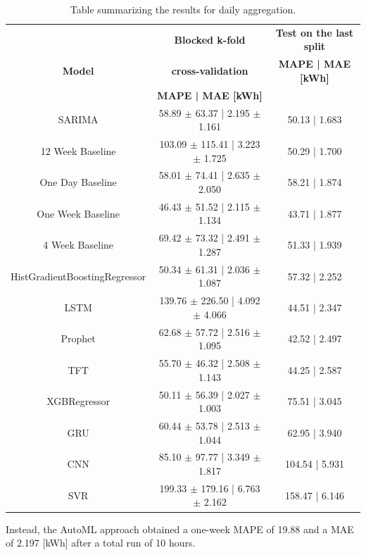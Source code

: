 \begin{table}[H]
\centering
\begin{tabular}{|c|c|c|}
\hline
 & \textbf{Blocked k-fold} & \textbf{Test on the last split}\\
\textbf{Model} & \textbf{cross-validation} & \textbf{MAPE | MAE [kWh]}\\
 & \textbf{MAPE | MAE [kWh]} & \\
\hline
SARIMA & 58.89 $\pm$ 63.37 | 2.195 $\pm$ 1.161 & 50.13 | 1.683\\
\hline
12 Week Baseline & 103.09 $\pm$ 115.41 | 3.223 $\pm$ 1.725 & 50.29 | 1.700\\
\hline
One Day Baseline & 58.01 $\pm$ 74.41 | 2.635 $\pm$ 2.050 & 58.21 | 1.874\\
\hline
One Week Baseline & 46.43 $\pm$ 51.52 | 2.115 $\pm$ 1.134 & 43.71 | 1.877\\
\hline
4 Week Baseline & 69.42 $\pm$ 73.32 | 2.491 $\pm$ 1.287 & 51.33 | 1.939\\
\hline
HistGradientBoostingRegressor & 50.34 $\pm$ 61.31 | 2.036 $\pm$ 1.087 & 57.32 | 2.252\\
\hline
LSTM & 139.76 $\pm$ 226.50 | 4.092 $\pm$ 4.066 & 44.51 | 2.347\\
\hline
Prophet & 62.68 $\pm$ 57.72 | 2.516 $\pm$ 1.095 & 42.52 | 2.497\\
\hline
TFT & 55.70 $\pm$ 46.32 | 2.508 $\pm$ 1.143 & 44.25 | 2.587\\
\hline
XGBRegressor & 50.11 $\pm$ 56.39 | 2.027 $\pm$ 1.003 & 75.51 | 3.045\\
\hline
GRU & 60.44 $\pm$ 53.78 | 2.513 $\pm$ 1.044 & 62.95 | 3.940\\
\hline
CNN & 85.10 $\pm$ 97.77 | 3.349 $\pm$ 1.817 & 104.54 | 5.931\\
\hline
SVR & 199.33 $\pm$ 179.16 | 6.763 $\pm$ 2.162 & 158.47 | 6.146\\
\hline
\end{tabular}
\caption{Table summarizing the results for daily aggregation.}
\label{tab:baselinedailyresults}
\end{table}

Instead, the AutoML approach obtained a one-week MAPE of 19.88 and a MAE of 2.197 [kWh] after a total run of 10 hours.

